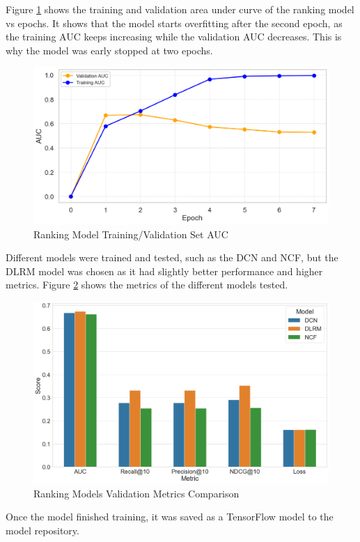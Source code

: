 Figure \ref{fig: RankingModelTraining} shows the training and validation area under curve of the ranking model vs epochs. It shows that the model starts overfitting after the second epoch, as the training AUC keeps increasing while the validation AUC decreases.
This is why the model was early stopped at two epochs.

\begin{figure}[H]
    \centering
    \includegraphics[width=1\textwidth]{assets/ranking_training_validation_auc.png}
    \caption{Ranking Model Training/Validation Set AUC}
    \label{fig: RankingModelTraining}
\end{figure}

Different models were trained and tested, such as the DCN and NCF, but the DLRM model was chosen as it had slightly better performance and higher metrics.
Figure \ref{fig: RankingModelsResults} shows the metrics of the different models tested.

\begin{figure}[H]
    \centering
    \includegraphics[width=\textwidth]{assets/Validation Metrics Comparison.png}
    \caption{Ranking Models Validation Metrics Comparison}
    \label{fig: RankingModelsResults}
\end{figure}


Once the model finished training, it was saved as a TensorFlow model to the model repository.